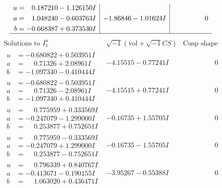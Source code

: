 \documentclass[1p]{elsarticle_modified}
\theoremstyle{definition}
\newcommand{\I}{\sqrt{-1}}
\begin{document}
$$\begin{array}{c|c|c}
\begin{aligned}
u &= \phantom{-}0.187210 - 1.126150 I \\
a &= \phantom{-}1.048240 - 0.603763 I \\
b &= -0.668387 + 0.373530 I\end{aligned}
 & -1.86846 - 1.01624 I & \phantom{-0.000000 } 0\\
 \hline 
 \end{array}$$\newpage$$\begin{array}{c|c|c}  
\text{Solutions to }I^u_{1}& \I (\text{vol} + \sqrt{-1}CS) & \text{Cusp shape}\\
 \hline 
\begin{aligned}
u &= -0.680822 + 0.503951 I \\
a &= \phantom{-}0.71326 + 2.08961 I \\
b &= -1.097340 - 0.410444 I\end{aligned}
 & -4.15515 - 0.77241 I & \phantom{-0.000000 } 0 \\ \hline\begin{aligned}
u &= -0.680822 - 0.503951 I \\
a &= \phantom{-}0.71326 - 2.08961 I \\
b &= -1.097340 + 0.410444 I\end{aligned}
 & -4.15515 + 0.77241 I & \phantom{-0.000000 } 0 \\ \hline\begin{aligned}
u &= \phantom{-}0.775959 + 0.333569 I \\
a &= -0.247079 - 1.299000 I \\
b &= \phantom{-}0.253877 + 0.752651 I\end{aligned}
 & -0.16735 + 1.55705 I & \phantom{-0.000000 } 0 \\ \hline\begin{aligned}
u &= \phantom{-}0.775959 - 0.333569 I \\
a &= -0.247079 + 1.299000 I \\
b &= \phantom{-}0.253877 - 0.752651 I\end{aligned}
 & -0.16735 - 1.55705 I & \phantom{-0.000000 } 0 \\ \hline\begin{aligned}
u &= \phantom{-}0.796339 + 0.840767 I \\
a &= -0.413671 - 0.190155 I \\
b &= \phantom{-}1.063020 + 0.436471 I\end{aligned}
 & -3.95267 - 0.55388 I & \phantom{-0.000000 } 0 \\ \hline\begin{aligned}

\end{aligned}
\end{array}$$
\end{document}
